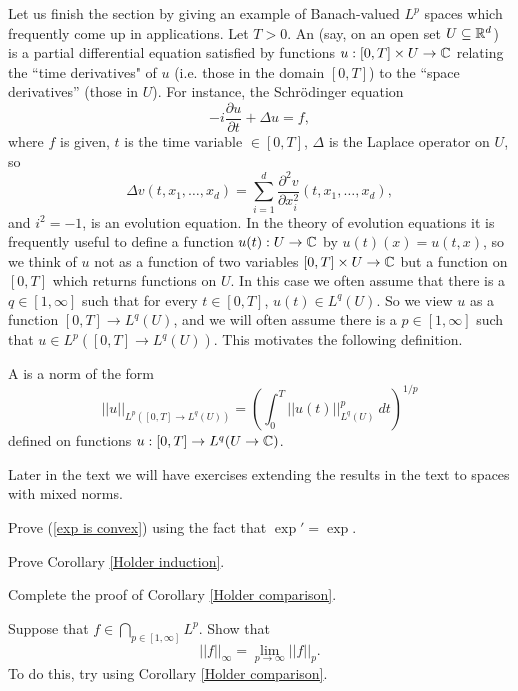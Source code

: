Let us finish the section by giving an example of Banach-valued $L^p$ spaces which frequently come up in applications.
Let $T > 0$. An  (say, on an open set $U \subseteq \mathbb{R}^d$) is a partial differential equation satisfied by functions $u: [0, T] \times U \to \mathbb{C}$ relating the ``time derivatives" of $u$ (i.e. those in the domain $[0, T]$) to the ``space derivatives'' (those in $U$).
For instance, the Schr\"odinger equation
\[-i\frac{\partial u}{\partial t} + \Delta u = f,\]
where $f$ is given, $t$ is the time variable $\in [0, T]$, $\Delta$ is the Laplace operator on $U$, so
\[\Delta v(t, x_1, \dots, x_d) = \sum_{i=1}^{d} \frac{\partial^2 v}{\partial x_i^2} (t, x_1, \dots, x_d), \]
and $i^2 = -1$, is an evolution equation.
In the theory of evolution equations it is frequently useful to define a function $u(t): U \to \mathbb{C}$ by $u(t)(x) = u(t, x)$, so we think of $u$ not as a function of two variables $[0, T] \times U \to \mathbb{C}$ but a function on $[0, T]$ which returns functions on $U$.
In this case we often assume that there is a $q \in [1, \infty]$ such that for every $t \in [0, T]$, $u(t) \in L^q(U)$.
So we view $u$ as a function $[0, T] \to L^q(U)$, and we will often assume there is a $p \in [1, \infty]$ such that $u \in L^p([0, T] \to L^q(U))$.
This motivates the following definition.

\begin{definition}
A  is a norm of the form
\[||u||_{L^p([0, T] \to L^q(U))} = \left(\int_0^{T} ||u(t)||_{L^q(U)}^p~dt\right)^{1/p}\]
defined on functions $u: [0, T] \to L^q(U \to \mathbb{C})$.
\end{definition}

Later in the text we will have exercises extending the results in the text to spaces with mixed norms.

\begin{exercise}
\label{exp is convex exer}
Prove (\ref{exp is convex}) using the fact that $\exp' = \exp$.
\end{exercise}

\begin{exercise}
\label{Holder induction exer}
Prove Corollary \ref{Holder induction}.
\end{exercise}

\begin{exercise}
\label{granular comparison}
Complete the proof of Corollary \ref{Holder comparison}.
\end{exercise}

\begin{exercise}
Suppose that $f \in \bigcap_{p \in [1, \infty]} L^p$. Show that
\[||f||_{\infty} = \lim_{p \to \infty} ||f||_{p} .\]
To do this, try using Corollary \ref{Holder comparison}.
\end{exercise}

